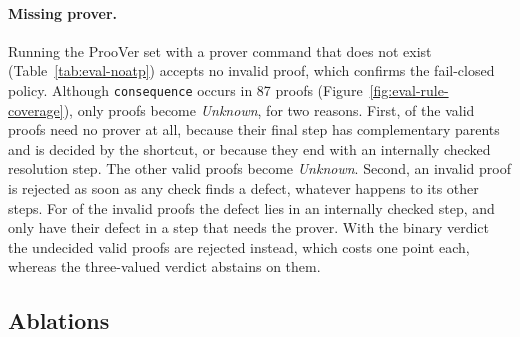 \begin{table}[!htb]
\centering
\small
\caption{Outcome for malformed inputs. \texttt{error} means that the parser rejected the file. Every input is processed in less than 0.2\,s.}
\label{tab:eval-inputs}

\end{table}

\paragraph{Missing prover.}
Running the ProoVer set with a prover command that does not exist (Table~\ref{tab:eval-noatp}) accepts no invalid proof, which confirms the fail-closed policy.
Although \texttt{consequence} occurs in 87 proofs (Figure~\ref{fig:eval-rule-coverage}), only \EvalNoAtpUncertain{} proofs become \emph{Unknown}, for two reasons.
First, \EvalNoAtpVerifiedValid{} of the \EvalOffValid{} valid proofs need no prover at all, because their final step has complementary parents and is decided by the shortcut, or because they end with an internally checked resolution step. The other \EvalNoAtpUncertainValid{} valid proofs become \emph{Unknown}.
Second, an invalid proof is rejected as soon as any check finds a defect, whatever happens to its other steps. For \EvalNoAtpRejInvalid{} of the \EvalOffInvalid{} invalid proofs the defect lies in an internally checked step, and only \EvalNoAtpUncertainInvalid{} have their defect in a step that needs the prover.
With the binary verdict the \EvalNoAtpRejValidBinary{} undecided valid proofs are rejected instead, which costs one point each, whereas the three-valued verdict abstains on them.

\begin{table}[!htb]
\centering
\small
\caption{The ProoVer set with and without the external prover, under the three-valued and the binary verdict. No setting verifies an invalid proof, and the binary verdict has no \emph{Unknown}.}
\label{tab:eval-noatp}

\end{table}

\subsection{Ablations}
\label{subsec:eval-ablation}

